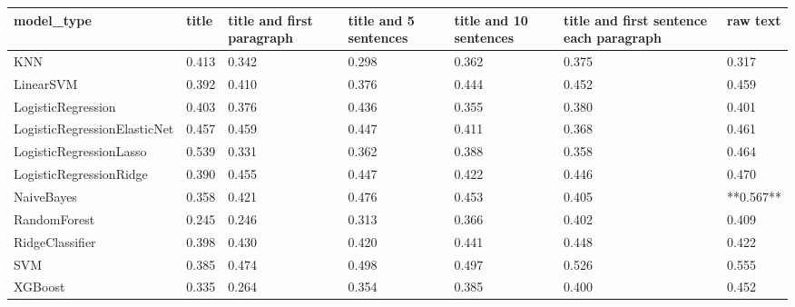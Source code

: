 \begin{tabular}{lllllll}
\toprule
                  model\_type & title & title and first paragraph & title and 5 sentences & title and 10 sentences & title and first sentence each paragraph &  raw text \\
\midrule
                         KNN & 0.413 &                     0.342 &                 0.298 &                  0.362 &                                   0.375 &     0.317 \\
                   LinearSVM & 0.392 &                     0.410 &                 0.376 &                  0.444 &                                   0.452 &     0.459 \\
          LogisticRegression & 0.403 &                     0.376 &                 0.436 &                  0.355 &                                   0.380 &     0.401 \\
LogisticRegressionElasticNet & 0.457 &                     0.459 &                 0.447 &                  0.411 &                                   0.368 &     0.461 \\
     LogisticRegressionLasso & 0.539 &                     0.331 &                 0.362 &                  0.388 &                                   0.358 &     0.464 \\
     LogisticRegressionRidge & 0.390 &                     0.455 &                 0.447 &                  0.422 &                                   0.446 &     0.470 \\
                  NaiveBayes & 0.358 &                     0.421 &                 0.476 &                  0.453 &                                   0.405 & **0.567** \\
                RandomForest & 0.245 &                     0.246 &                 0.313 &                  0.366 &                                   0.402 &     0.409 \\
             RidgeClassifier & 0.398 &                     0.430 &                 0.420 &                  0.441 &                                   0.448 &     0.422 \\
                         SVM & 0.385 &                     0.474 &                 0.498 &                  0.497 &                                   0.526 &     0.555 \\
                     XGBoost & 0.335 &                     0.264 &                 0.354 &                  0.385 &                                   0.400 &     0.452 \\
\bottomrule
\end{tabular}
